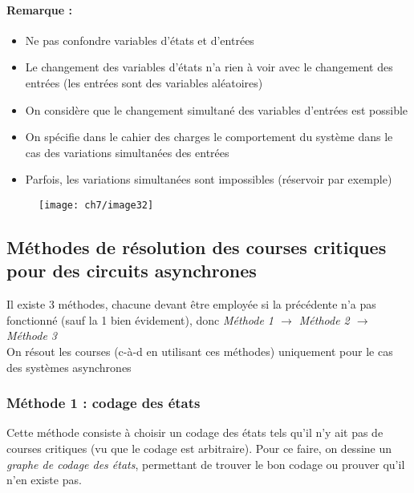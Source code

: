 \paragraph{Remarque :} 
\begin{itemize}
	\item Ne pas confondre variables d'états et d'entrées
	\item Le changement des variables d'états n'a rien à voir avec le changement des entrées (les entrées sont des variables aléatoires)
	\item On considère que le changement simultané des variables d'entrées est possible
	\item On spécifie dans le cahier des charges le comportement du système dans le cas des variations simultanées des entrées
	\item Parfois, les variations simultanées sont impossibles (réservoir par exemple)
\end{itemize}
\begin{figure}[H]
	\centering
	\texttt{[image: ch7/image32]}
\end{figure}
\subsection{Méthodes de résolution des courses critiques pour des circuits asynchrones}
Il existe 3 méthodes, chacune devant être employée si la précédente n'a pas fonctionné (sauf la 1 bien évidement), donc \emph{Méthode 1 $\rightarrow$ Méthode 2 $\rightarrow$ Méthode 3}\\
\danger On résout les courses (c-à-d en utilisant ces méthodes) uniquement pour le cas des systèmes asynchrones
\subsubsection{Méthode 1 : codage des états}
Cette méthode consiste à choisir un codage des états tels qu'il n'y ait pas de courses critiques (vu que le codage est arbitraire). Pour ce faire, on dessine un \emph{graphe de codage des états}, permettant de trouver le bon codage ou prouver qu'il n'en existe pas.
